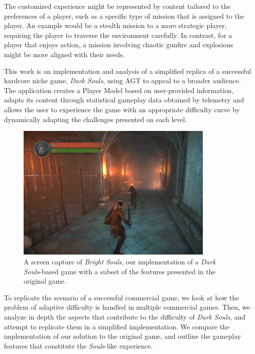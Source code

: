 \documentclass[cic,tc,english]{iiufrgs}
\begin{document}
The customized experience might be represented by content tailored to the preferences of a player, such as a specific type of mission that is assigned to the player. An example would be a stealth mission to a more strategic player, requiring the player to traverse the environment carefully. In contrast, for a player that enjoys action, a mission involving chaotic gunfire and explosions might be more aligned with their needs.

This work is an implementation and analysis of a simplified replica of a successful hardcore niche game, \emph{Dark Souls}, using AGT to appeal to a broader audience. The application creates a Player Model based on user-provided information, adapts its content through statistical gameplay data obtained by telemetry and allows the user to experience the game with an appropriate difficulty curve by dynamically adapting the challenges presented on each level.

\begin{figure}[!h]
    \caption{A screen capture of \emph{Bright Souls}, our implementation of a \emph{Dark Souls}-based game with a subset of the features presented in the original game.}
    \begin{center}
        \includegraphics[width=26em]{figures/fig-bright-souls.jpg}
    \end{center}
    \label{fig:ex1}
\end{figure}

To replicate the scenario of a successful commercial game, we look at how the problem of adaptive difficulty  is handled in multiple commercial games. Then, we analyze in depth the aspects that contribute to the difficulty of \emph{Dark Souls}, and attempt to replicate them in a simplified implementation. We compare the implementation of our solution to the original game, and outline the gameplay features that constitute the \emph{Souls}-like experience.
\end{document}
